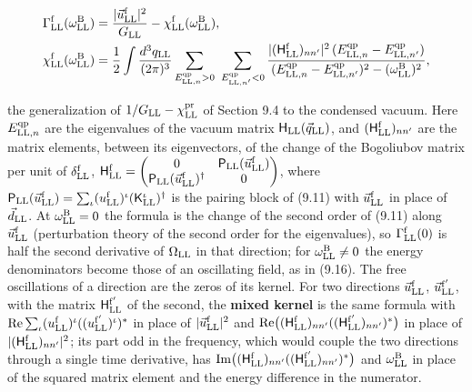 \documentclass[
  10pt,
]{article}
\begin{document}
\[\begin{aligned}\Gamma^{\rm f}_{\rm LL}(\omega^{\rm B}_{\rm LL})&=\frac{\lvert\vec u^{\rm f}_{\rm LL}\rvert^2}{G_{\rm LL}}-\chi^{\rm f}_{\rm LL}(\omega^{\rm B}_{\rm LL}),\\\chi^{\rm f}_{\rm LL}(\omega^{\rm B}_{\rm LL})&=\frac12\int\frac{d^3q_{\rm LL}}{(2\pi)^3}\sum_{E^{\rm qp}_{{\rm LL},n}>0}\ \sum_{E^{\rm qp}_{{\rm LL},n'}<0}\frac{\lvert(\mathsf H^{\rm f}_{\rm LL})_{nn'}\rvert^2\,(E^{\rm qp}_{{\rm LL},n}-E^{\rm qp}_{{\rm LL},n'})}{(E^{\rm qp}_{{\rm LL},n}-E^{\rm qp}_{{\rm LL},n'})^2-(\omega^{\rm B}_{\rm LL})^2},\end{aligned}\]

the generalization of \(1/G_{\rm LL}-\chi^{\rm pr}_{\rm LL}\) of Section
9.4 to the condensed vacuum. Here \(E^{\rm qp}_{{\rm LL},n}\) are the
eigenvalues of the vacuum matrix
\(\mathsf H_{\rm LL}(\vec q_{\rm LL})\), and
\((\mathsf H^{\rm f}_{\rm LL})_{nn'}\) are the matrix elements, between
its eigenvectors, of the change of the Bogoliubov matrix per unit of
\(\delta^{\rm f}_{\rm LL}\),
\(\mathsf H^{\rm f}_{\rm LL}=\begin{pmatrix}0&\mathsf P_{\rm LL}(\vec u^{\rm f}_{\rm LL})\\\mathsf P_{\rm LL}(\vec u^{\rm f}_{\rm LL})^\dagger&0\end{pmatrix}\),
where
\(\mathsf P_{\rm LL}(\vec u^{\rm f}_{\rm LL})=\sum_\iota(u^{\rm f}_{\rm LL})^\iota(\mathsf K^\iota_{\rm LL})^\dagger\)
is the pairing block of (9.11) with \(\vec u^{\rm f}_{\rm LL}\) in place
of \(\vec d_{\rm LL}\). At \(\omega^{\rm B}_{\rm LL}=0\) the formula is
the change of the second order of (9.11) along
\(\vec u^{\rm f}_{\rm LL}\) (perturbation theory of the second order for
the eigenvalues), so \(\Gamma^{\rm f}_{\rm LL}(0)\) is half the second
derivative of \(\Omega_{\rm LL}\) in that direction; for
\(\omega^{\rm B}_{\rm LL}\neq0\) the energy denominators become those of
an oscillating field, as in (9.16). The free oscillations of a direction
are the zeros of its kernel. For two directions
\(\vec u^{\rm f}_{\rm LL}\), \(\vec u^{\rm f'}_{\rm LL}\), with the
matrix \(\mathsf H^{\rm f'}_{\rm LL}\) of the second, the \textbf{mixed
kernel} is the same formula with
\({\rm Re}\sum_\iota(u^{\rm f}_{\rm LL})^\iota((u^{\rm f'}_{\rm LL})^\iota)^*\)
in place of \(\lvert\vec u^{\rm f}_{\rm LL}\rvert^2\) and
\({\rm Re}\big((\mathsf H^{\rm f}_{\rm LL})_{nn'}((\mathsf H^{\rm f'}_{\rm LL})_{nn'})^*\big)\)
in place of \(\lvert(\mathsf H^{\rm f}_{\rm LL})_{nn'}\rvert^2\); its
part odd in the frequency, which would couple the two directions through
a single time derivative, has
\({\rm Im}\big((\mathsf H^{\rm f}_{\rm LL})_{nn'}((\mathsf H^{\rm f'}_{\rm LL})_{nn'})^*\big)\)
and \(\omega^{\rm B}_{\rm LL}\) in place of the squared matrix element
and the energy difference in the numerator.
\end{document}
